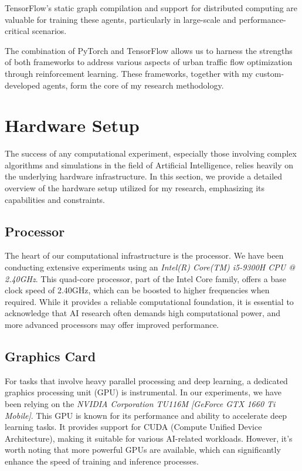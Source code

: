 TensorFlow's static graph compilation and support for distributed computing are valuable for training these agents, particularly in large-scale and performance-critical scenarios.

The combination of PyTorch and TensorFlow allows us to harness the strengths of both frameworks to address various aspects of urban traffic flow optimization through reinforcement learning. These frameworks, together with my custom-developed agents, form the core of my research methodology.

\section{Hardware Setup}

The success of any computational experiment, especially those involving complex algorithms and simulations in the field of Artificial Intelligence, relies heavily on the underlying hardware infrastructure. In this section, we provide a detailed overview of the hardware setup utilized for my research, emphasizing its capabilities and constraints.

\subsection{Processor}

The heart of our computational infrastructure is the processor. We have been conducting extensive experiments using an \textit{Intel(R) Core(TM) i5-9300H CPU @ 2.40GHz}. This quad-core processor, part of the Intel Core family, offers a base clock speed of 2.40GHz, which can be boosted to higher frequencies when required. While it provides a reliable computational foundation, it is essential to acknowledge that AI research often demands high computational power, and more advanced processors may offer improved performance.

\subsection{Graphics Card}

For tasks that involve heavy parallel processing and deep learning, a dedicated graphics processing unit (GPU) is instrumental. In our experiments, we have been relying on the \textit{NVIDIA Corporation TU116M [GeForce GTX 1660 Ti Mobile]}. This GPU is known for its performance and ability to accelerate deep learning tasks. It provides support for CUDA (Compute Unified Device Architecture), making it suitable for various AI-related workloads. However, it's worth noting that more powerful GPUs are available, which can significantly enhance the speed of training and inference processes.

